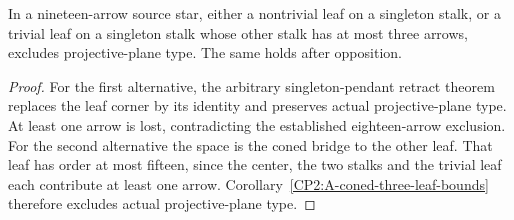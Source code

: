 \begin{corollary}
\label{CP2:A-nineteen-star-pendant-and-coned}
In a nineteen-arrow source star, either a nontrivial leaf on a
singleton stalk, or a trivial leaf on a singleton stalk whose
other stalk has at most three arrows, excludes projective-plane
type. The same holds after opposition.
\end{corollary}
\begin{proof}
For the first alternative, the arbitrary singleton-pendant
retract theorem replaces the leaf corner by its identity and
preserves actual projective-plane type. At least one arrow is
lost, contradicting the established eighteen-arrow exclusion.
For the second alternative the space is the coned bridge to the
other leaf. That leaf has order at most fifteen, since the
center, the two stalks and the trivial leaf each contribute at
least one arrow. Corollary~\ref{CP2:A-coned-three-leaf-bounds}
therefore excludes actual projective-plane type.
\end{proof}
